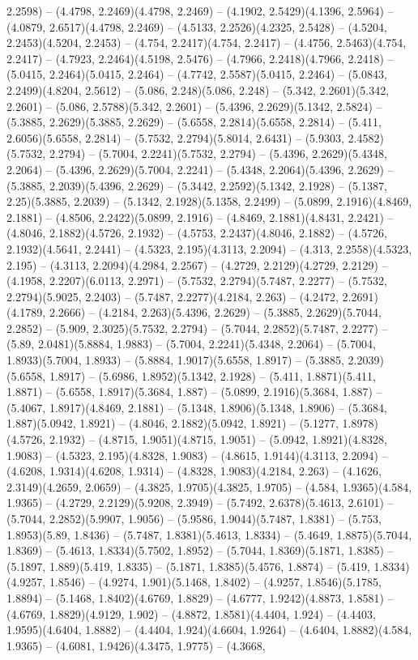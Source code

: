 2.2598) -- (4.4798, 2.2469)(4.4798, 2.2469) -- (4.1902, 2.5429)(4.1396, 2.5964) -- (4.0879, 2.6517)(4.4798, 2.2469) -- (4.5133, 2.2526)(4.2325, 2.5428) -- (4.5204, 2.2453)(4.5204, 2.2453) -- (4.754, 2.2417)(4.754, 2.2417) -- (4.4756, 2.5463)(4.754, 2.2417) -- (4.7923, 2.2464)(4.5198, 2.5476) -- (4.7966, 2.2418)(4.7966, 2.2418) -- (5.0415, 2.2464)(5.0415, 2.2464) -- (4.7742, 2.5587)(5.0415, 2.2464) -- (5.0843, 2.2499)(4.8204, 2.5612) -- (5.086, 2.248)(5.086, 2.248) -- (5.342, 2.2601)(5.342, 2.2601) -- (5.086, 2.5788)(5.342, 2.2601) -- (5.4396, 2.2629)(5.1342, 2.5824) -- (5.3885, 2.2629)(5.3885, 2.2629) -- (5.6558, 2.2814)(5.6558, 2.2814) -- (5.411, 2.6056)(5.6558, 2.2814) -- (5.7532, 2.2794)(5.8014, 2.6431) -- (5.9303, 2.4582)(5.7532, 2.2794) -- (5.7004, 2.2241)(5.7532, 2.2794) -- (5.4396, 2.2629)(5.4348, 2.2064) -- (5.4396, 2.2629)(5.7004, 2.2241) -- (5.4348, 2.2064)(5.4396, 2.2629) -- (5.3885, 2.2039)(5.4396, 2.2629) -- (5.3442, 2.2592)(5.1342, 2.1928) -- (5.1387, 2.25)(5.3885, 2.2039) -- (5.1342, 2.1928)(5.1358, 2.2499) -- (5.0899, 2.1916)(4.8469, 2.1881) -- (4.8506, 2.2422)(5.0899, 2.1916) -- (4.8469, 2.1881)(4.8431, 2.2421) -- (4.8046, 2.1882)(4.5726, 2.1932) -- (4.5753, 2.2437)(4.8046, 2.1882) -- (4.5726, 2.1932)(4.5641, 2.2441) -- (4.5323, 2.195)(4.3113, 2.2094) -- (4.313, 2.2558)(4.5323, 2.195) -- (4.3113, 2.2094)(4.2984, 2.2567) -- (4.2729, 2.2129)(4.2729, 2.2129) -- (4.1958, 2.2207)(6.0113, 2.2971) -- (5.7532, 2.2794)(5.7487, 2.2277) -- (5.7532, 2.2794)(5.9025, 2.2403) -- (5.7487, 2.2277)(4.2184, 2.263) -- (4.2472, 2.2691)(4.1789, 2.2666) -- (4.2184, 2.263)(5.4396, 2.2629) -- (5.3885, 2.2629)(5.7044, 2.2852) -- (5.909, 2.3025)(5.7532, 2.2794) -- (5.7044, 2.2852)(5.7487, 2.2277) -- (5.89, 2.0481)(5.8884, 1.9883) -- (5.7004, 2.2241)(5.4348, 2.2064) -- (5.7004, 1.8933)(5.7004, 1.8933) -- (5.8884, 1.9017)(5.6558, 1.8917) -- (5.3885, 2.2039)(5.6558, 1.8917) -- (5.6986, 1.8952)(5.1342, 2.1928) -- (5.411, 1.8871)(5.411, 1.8871) -- (5.6558, 1.8917)(5.3684, 1.887) -- (5.0899, 2.1916)(5.3684, 1.887) -- (5.4067, 1.8917)(4.8469, 2.1881) -- (5.1348, 1.8906)(5.1348, 1.8906) -- (5.3684, 1.887)(5.0942, 1.8921) -- (4.8046, 2.1882)(5.0942, 1.8921) -- (5.1277, 1.8978)(4.5726, 2.1932) -- (4.8715, 1.9051)(4.8715, 1.9051) -- (5.0942, 1.8921)(4.8328, 1.9083) -- (4.5323, 2.195)(4.8328, 1.9083) -- (4.8615, 1.9144)(4.3113, 2.2094) -- (4.6208, 1.9314)(4.6208, 1.9314) -- (4.8328, 1.9083)(4.2184, 2.263) -- (4.1626, 2.3149)(4.2659, 2.0659) -- (4.3825, 1.9705)(4.3825, 1.9705) -- (4.584, 1.9365)(4.584, 1.9365) -- (4.2729, 2.2129)(5.9208, 2.3949) -- (5.7492, 2.6378)(5.4613, 2.6101) -- (5.7044, 2.2852)(5.9907, 1.9056) -- (5.9586, 1.9044)(5.7487, 1.8381) -- (5.753, 1.8953)(5.89, 1.8436) -- (5.7487, 1.8381)(5.4613, 1.8334) -- (5.4649, 1.8875)(5.7044, 1.8369) -- (5.4613, 1.8334)(5.7502, 1.8952) -- (5.7044, 1.8369)(5.1871, 1.8385) -- (5.1897, 1.889)(5.419, 1.8335) -- (5.1871, 1.8385)(5.4576, 1.8874) -- (5.419, 1.8334)(4.9257, 1.8546) -- (4.9274, 1.901)(5.1468, 1.8402) -- (4.9257, 1.8546)(5.1785, 1.8894) -- (5.1468, 1.8402)(4.6769, 1.8829) -- (4.6777, 1.9242)(4.8873, 1.8581) -- (4.6769, 1.8829)(4.9129, 1.902) -- (4.8872, 1.8581)(4.4404, 1.924) -- (4.4403, 1.9595)(4.6404, 1.8882) -- (4.4404, 1.924)(4.6604, 1.9264) -- (4.6404, 1.8882)(4.584, 1.9365) -- (4.6081, 1.9426)(4.3475, 1.9775) -- (4.3668, 